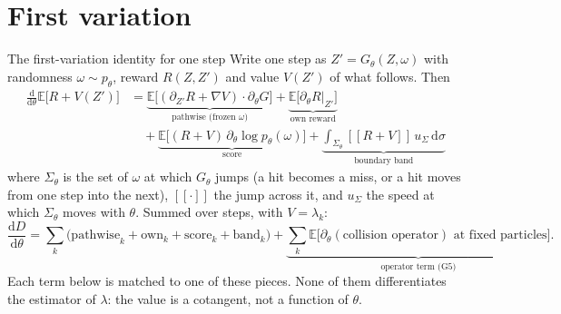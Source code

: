 \documentclass[10pt,aspectratio=169]{beamer}
\newcommand{\E}{\mathbb{E}}
\newcommand{\dd}{\mathrm{d}}
\begin{document}
\section{First variation}

\begin{frame}{The first-variation identity for one step}
Write one step as $Z' = G_\theta(Z, \omega)$ with randomness $\omega \sim p_\theta$, reward
$R(Z, Z')$ and value $V(Z')$ of what follows.  Then
\begin{align*}
\frac{\dd}{\dd\theta}\E\big[R + V(Z')\big]
&= \underbrace{\E\big[(\partial_{Z'}R + \nabla V)\cdot\partial_\theta G\big]}_{\text{pathwise (frozen }\omega)}
+ \underbrace{\E\big[\partial_\theta R\big|_{Z'}\big]}_{\text{own reward}}\\
&\quad+ \underbrace{\E\big[(R + V)\,\partial_\theta\log p_\theta(\omega)\big]}_{\text{score}}
+ \underbrace{\int_{\Sigma_\theta}[\![R + V]\!]\, u_\Sigma\,\dd\sigma}_{\text{boundary band}}
\end{align*}
where $\Sigma_\theta$ is the set of $\omega$ at which $G_\theta$ jumps (a hit becomes a miss, or
a hit moves from one step into the next), $[\![\cdot]\!]$ the jump across it, and $u_\Sigma$ the
speed at which $\Sigma_\theta$ moves with $\theta$.  Summed over steps, with $V = \lambda_{k}$:
\[
\frac{\dd D}{\dd\theta} = \sum_k\Big(\text{pathwise}_k + \text{own}_k + \text{score}_k + \text{band}_k\Big)
+ \underbrace{\sum_k \E\big[\partial_\theta(\text{collision operator})\text{ at fixed particles}\big]}_{\text{operator term (G5)}} .
\]
Each term below is matched to one of these pieces.  None of them differentiates the
estimator of $\lambda$: the value is a cotangent, not a function of $\theta$.
\end{frame}
\end{document}
